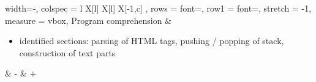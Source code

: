 {\begin{tblr}{
	width=\linewidth-\parindent,
	colspec = {
		l
		X[l]
		X[l]
		X[-1,c]
	},
	rows = {font=\footnotesize},
	row{1} = {font=\footnotesize\bfseries},
	stretch = -1,
	measure = vbox,
}
	Program comprehension	&
	\begin{itemize}
		\item identified sections: parsing of HTML tags, pushing / popping of stack, construction of text parts
	\end{itemize}
		&
	 {-}	&
	$+$	\\

	\bottomrule
\end{tblr}

}

